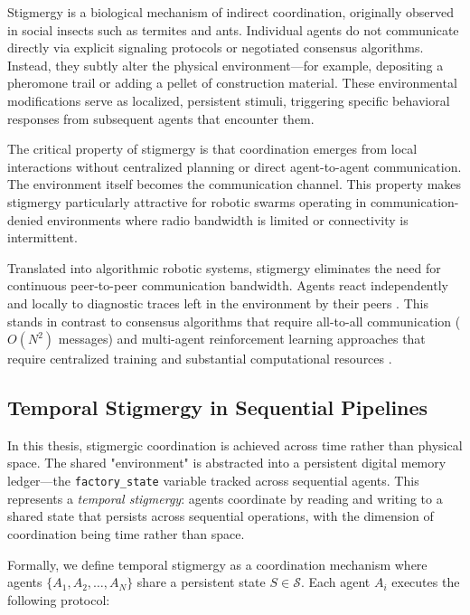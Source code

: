 \documentclass[12pt,a4paper,oneside]{report}
\begin{document}
Stigmergy is a biological mechanism of indirect coordination, originally observed in social insects such as termites and ants. Individual agents do not communicate directly via explicit signaling protocols or negotiated consensus algorithms. Instead, they subtly alter the physical environment—for example, depositing a pheromone trail or adding a pellet of construction material. These environmental modifications serve as localized, persistent stimuli, triggering specific behavioral responses from subsequent agents that encounter them.

The critical property of stigmergy is that coordination emerges from local interactions without centralized planning or direct agent-to-agent communication. The environment itself becomes the communication channel. This property makes stigmergy particularly attractive for robotic swarms operating in communication-denied environments where radio bandwidth is limited or connectivity is intermittent.

Translated into algorithmic robotic systems, stigmergy eliminates the need for continuous peer-to-peer communication bandwidth. Agents react independently and locally to diagnostic traces left in the environment by their peers \cite{bongard2006resilient}. This stands in contrast to consensus algorithms that require all-to-all communication ($O(N^2)$ messages) and multi-agent reinforcement learning approaches that require centralized training and substantial computational resources \cite{domberg2026selfadapting, daneshmand2026slowrl}.

\subsection{Temporal Stigmergy in Sequential Pipelines}
\label{subsec:temporal_stigmergy_in_sequential_pipelines}

In this thesis, stigmergic coordination is achieved across time rather than physical space. The shared "environment" is abstracted into a persistent digital memory ledger—the \texttt{factory\_state} variable tracked across sequential agents. This represents a \textit{temporal stigmergy}: agents coordinate by reading and writing to a shared state that persists across sequential operations, with the dimension of coordination being time rather than space.

Formally, we define temporal stigmergy as a coordination mechanism where agents $\{A_1, A_2, \ldots, A_N\}$ share a persistent state $S \in \mathcal{S}$. Each agent $A_i$ executes the following protocol:
\end{document}
